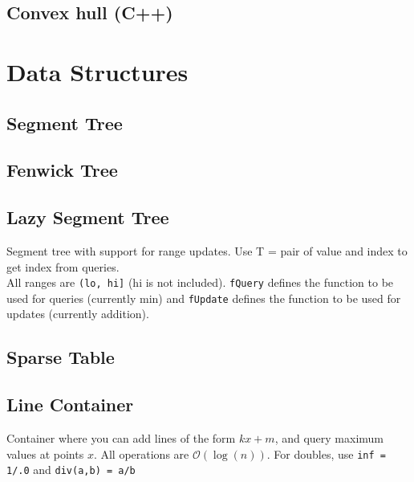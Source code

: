 \documentclass{article}
\begin{document}
\subsection*{Convex hull (C++)}


\section*{Data Structures}

\subsection*{Segment Tree}


\subsection*{Fenwick Tree}


\subsection*{Lazy Segment Tree}
Segment tree with support for range updates. Use T = pair of value and index to get index from queries.\\
All ranges are \lstinline{(lo, hi]} (hi is not included).
\lstinline{fQuery} defines the function to be used for queries (currently min) and 
\lstinline{fUpdate} defines the function to be used for updates (currently addition).


\pagebreak

\subsection*{Sparse Table}


\subsection*{Line Container}
Container where you can add lines of the form $kx + m$, and query maximum values at points $x$.
All operations are $\mathcal{O}(\log(n))$. For doubles, use \lstinline{inf = 1/.0} and \lstinline{div(a,b) = a/b}

\end{document}

